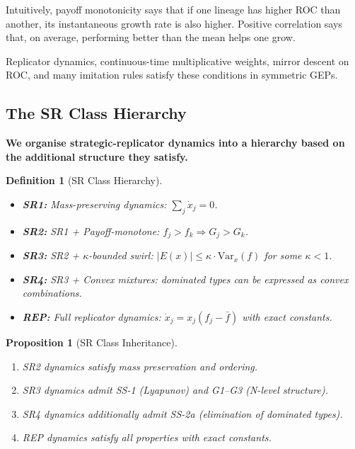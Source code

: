 \documentclass[12pt]{article}
\newtheorem{proposition}[theorem]{Proposition}
\newtheorem{definition}[theorem]{Definition}
\newcommand{\Var}{\mathrm{Var}}
\newcommand{\added}[1]{\textbf{#1}}
\begin{document}
Intuitively, payoff monotonicity says that if one lineage has higher ROC than another, its instantaneous growth rate is also higher. Positive correlation says that, on average, performing better than the mean helps one grow.

Replicator dynamics, continuous-time multiplicative weights, mirror descent on ROC, and many imitation rules satisfy these conditions in symmetric GEPs.

\subsection{The SR Class Hierarchy}

\added{\textbf{We organise strategic-replicator dynamics into a hierarchy based on the additional structure they satisfy.}}

\begin{definition}[SR Class Hierarchy]
\label{def:sr-hierarchy}
\begin{itemize}
    \item \textbf{SR1:} Mass-preserving dynamics: $\sum_j \dot{x}_j = 0$.
    
    \item \textbf{SR2:} SR1 + Payoff-monotone: $f_j > f_k \Rightarrow G_j > G_k$.
    
    \item \textbf{SR3:} SR2 + $\kappa$-bounded swirl: $|E(x)| \leq \kappa \cdot \Var_x(f)$ for some $\kappa < 1$.
    
    \item \textbf{SR4:} SR3 + Convex mixtures: dominated types can be expressed as convex combinations.
    
    \item \textbf{REP:} Full replicator dynamics: $\dot{x}_j = x_j(f_j - \bar{f})$ with exact constants.
\end{itemize}
\end{definition}

\begin{proposition}[SR Class Inheritance]
\label{prop:sr-inheritance}
\begin{enumerate}
    \item SR2 dynamics satisfy mass preservation and ordering.
    \item SR3 dynamics admit SS-1 (Lyapunov) and G1--G3 (N-level structure).
    \item SR4 dynamics additionally admit SS-2a (elimination of dominated types).
    \item REP dynamics satisfy all properties with exact constants.
\end{enumerate}
\end{proposition}
\end{document}
